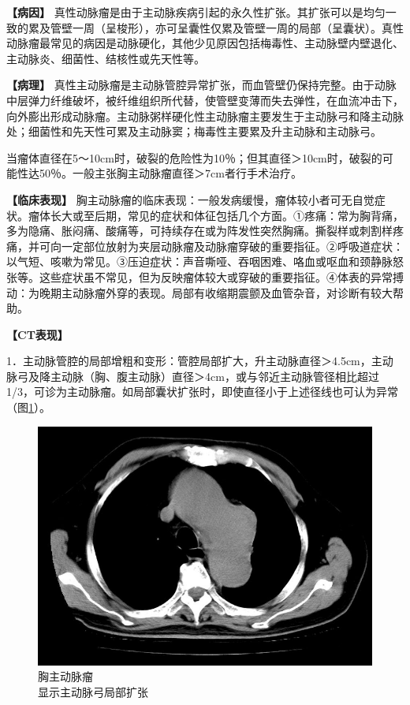\textbf{【病因】}
真性动脉瘤是由于主动脉疾病引起的永久性扩张。其扩张可以是均匀一致的累及管壁一周（呈梭形），亦可呈囊性仅累及管壁一周的局部（呈囊状）。真性动脉瘤最常见的病因是动脉硬化，其他少见原因包括梅毒性、主动脉壁内壁退化、主动脉炎、细菌性、结核性或先天性等。

\textbf{【病理】}
真性主动脉瘤是主动脉管腔异常扩张，而血管壁仍保持完整。由于动脉中层弹力纤维破坏，被纤维组织所代替，使管壁变薄而失去弹性，在血流冲击下，向外膨出形成动脉瘤。主动脉粥样硬化性主动脉瘤主要发生于主动脉弓和降主动脉处；细菌性和先天性可累及主动脉窦；梅毒性主要累及升主动脉和主动脉弓。

当瘤体直径在5～10cm时，破裂的危险性为10％；但其直径＞10cm时，破裂的可能性达50％。一般主张胸主动脉瘤直径＞7cm者行手术治疗。

\textbf{【临床表现】}
胸主动脉瘤的临床表现：一般发病缓慢，瘤体较小者可无自觉症状。瘤体长大或至后期，常见的症状和体征包括几个方面。①疼痛：常为胸背痛，多为隐痛、胀闷痛、酸痛等，可持续存在或为阵发性突然胸痛。撕裂样或刺割样疼痛，并可向一定部位放射为夹层动脉瘤及动脉瘤穿破的重要指征。②呼吸道症状：以气短、咳嗽为常见。③压迫症状：声音嘶哑、吞咽困难、咯血或呕血和颈静脉怒张等。这些症状虽不常见，但为反映瘤体较大或穿破的重要指征。④体表的异常搏动：为晚期主动脉瘤外穿的表现。局部有收缩期震颤及血管杂音，对诊断有较大帮助。

\textbf{【CT表现】}

1．主动脉管腔的局部增粗和变形：管腔局部扩大，升主动脉直径＞4.5cm，主动脉弓及降主动脉（胸、腹主动脉）直径＞4cm，或与邻近主动脉管径相比超过1/3，可诊为主动脉瘤。如局部囊状扩张时，即使直径小于上述径线也可认为异常（图\ref{fig10-3}）。

\begin{figure}[!htbp]
 \centering
 \includegraphics[width=.7\textwidth,height=\textheight,keepaspectratio]{./images/Image00262.jpg}
 \captionsetup{justification=centering}
 \caption{胸主动脉瘤\\{\small 显示主动脉弓局部扩张}}
 \label{fig10-3}
  \end{figure} 

